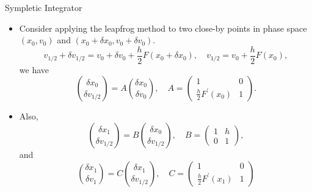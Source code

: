 \documentclass{beamer}
\begin{document}
 \begin{frame}{Sympletic Integrator}
  \begin{itemize}
  \item Consider applying the leapfrog method to two close-by points in phase space $(x_0,v_0)$ and $(x_0+\delta x_0,v_0+\delta v_0)$.
    \[
    v_{1 / 2}+\delta v_{1 / 2}=v_0+\delta v_0+\frac{h}{2} F\left(x_0+\delta x_0\right), \quad v_{1 / 2}=v_0+\frac{h}{2} F\left(x_0\right),
    \]
    we have
    $$
\binom{\delta x_0}{\delta v_{1 / 2}}=A\binom{\delta x_0}{\delta v_0}, \quad
A=\left(\begin{array}{cc}
1 & 0 \\
\frac{h}{2} F^{\prime}\left(x_0\right) & 1
\end{array}\right) .
$$
\item Also, 
$$
\binom{\delta x_1}{\delta v_{1 / 2}}=B\binom{\delta x_0}{\delta v_{1 / 2}}, \quad B=\left(\begin{array}{ll}
  1 & h \\
  0 & 1
  \end{array}\right),
$$
and 
$$
\binom{\delta x_1}{\delta v_1}=C\binom{\delta x_1}{\delta v_{1 / 2}}, \quad C=\left(\begin{array}{cc}
  1 & 0 \\
  \frac{h}{2} F^{\prime}\left(x_1\right) & 1
  \end{array}\right)
$$

  \end{itemize}
 \end{frame}
\end{document}
